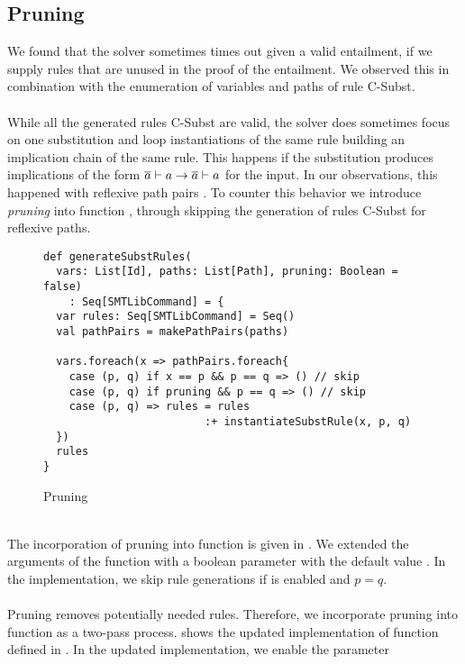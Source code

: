 \subsection{Pruning}
\label{sec:pruning}
We found that the solver sometimes times out
given a valid entailment, if we supply rules
that are unused in the proof of the entailment.
We observed this in combination
with the enumeration of variables and paths of rule C-Subst.\\
\\
While all the generated rules C-Subst are valid,
the solver does sometimes focus on one substitution
and loop instantiations of the same rule
building an implication chain of the same rule.
This happens if the substitution produces implications
of the form $\overline{a} \vdash a \rightarrow \overline{a} \vdash a$
for the input.
In our observations, this happened with reflexive path pairs .
To counter this behavior we introduce \textit{pruning} into function ,
through skipping the generation of rules C-Subst for reflexive paths.
%
\begin{figure}[h]
\begin{lstlisting}
def generateSubstRules(
  vars: List[Id], paths: List[Path], pruning: Boolean = false)
    : Seq[SMTLibCommand] = {
  var rules: Seq[SMTLibCommand] = Seq()
  val pathPairs = makePathPairs(paths)

  vars.foreach(x => pathPairs.foreach{
    case (p, q) if x == p && p == q => () // skip
    case (p, q) if pruning && p == q => () // skip
    case (p, q) => rules = rules
                         :+ instantiateSubstRule(x, p, q)
  })
  rules
}
\end{lstlisting}
\caption{Pruning}
\label{fig:scala-pruning}
\end{figure}\\
The incorporation of pruning into function 
is given in .
We extended the arguments of the function with a
boolean parameter  with the default value .
In the implementation, we skip rule generations
if  is enabled and $p = q$.\\
\\
Pruning removes potentially needed rules.
Therefore, we incorporate pruning into function
 as a two-pass process.
 shows the updated
implementation of function  defined in .
In the updated implementation, we enable the  parameter

